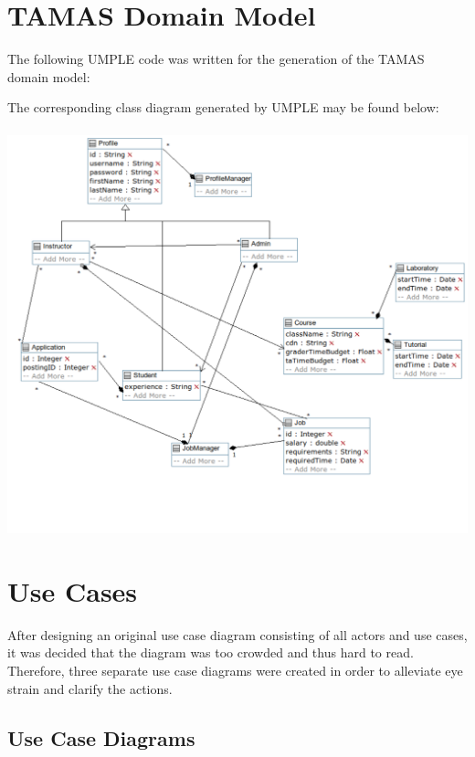 \documentclass[12pt,openany]{report}
\begin{document}
\chapter{TAMAS Domain Model}
The following UMPLE code was written for the generation of the TAMAS domain model:

The corresponding class diagram generated by UMPLE may be found below:\\\\
\includegraphics[scale=0.6]{model/Diagrams/classdiagram}

\chapter{Use Cases}
After designing an original use case diagram consisting of all actors and use cases, it was decided
that the diagram was too crowded and thus hard to read. Therefore, three separate use case diagrams
were created in order to alleviate eye strain and clarify the actions.
\section{Use Case Diagrams}
\end{document}
